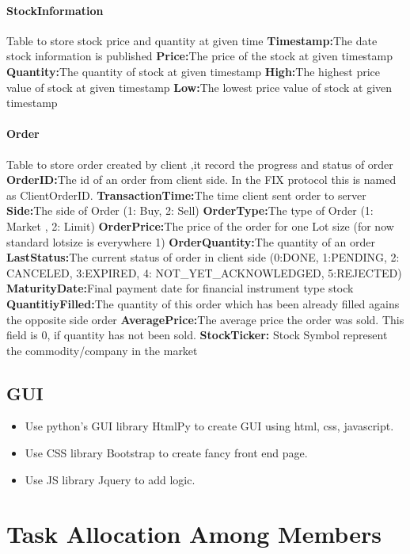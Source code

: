 \documentclass[a4paper, 11pt]{article}
\begin{document}
\paragraph*{StockInformation}
Table to store stock price and quantity at given time
\textbf{Timestamp:}The date stock information is published
\textbf{Price:}The price of the stock at given timestamp 
\textbf{Quantity:}The quantity of stock at given timestamp 
\textbf{High:}The highest price value of stock at given timestamp
\textbf{Low:}The lowest price value of stock at given timestamp

\paragraph*{Order}
Table to store order created by client ,it record the progress and status of order
\textbf{OrderID:}The id of an order from client side. In the FIX protocol this is named as ClientOrderID.
\textbf{TransactionTime:}The time client sent order to server 
\textbf{Side:}The side of Order (1: Buy, 2: Sell)
\textbf{OrderType:}The type of Order (1: Market , 2: Limit)
\textbf{OrderPrice:}The price of the order for one Lot size (for now standard lotsize is everywhere 1)
\textbf{OrderQuantity:}The quantity of an order
\textbf{LastStatus:}The current status of order in client side (0:DONE, 1:PENDING, 2: CANCELED, 3:EXPIRED, 4: NOT\_YET\_ACKNOWLEDGED, 5:REJECTED)
\textbf{MaturityDate:}Final payment date for financial instrument type stock
\textbf{QuantitiyFilled:}The quantity of this order which has been already filled agains the opposite side order
\textbf{AveragePrice:}The average price the order was sold. This field is 0, if quantity has  not been sold.
\textbf{StockTicker:} Stock Symbol represent the commodity/company in the market

\subsection*{GUI}
\begin{itemize}
  \item Use python's GUI library HtmlPy to create GUI using html, css, javascript.
  \item Use CSS library Bootstrap to create fancy front end page. 
  \item Use JS library Jquery to add logic.
\end{itemize}




\section*{Task Allocation Among Members}
\end{document}
